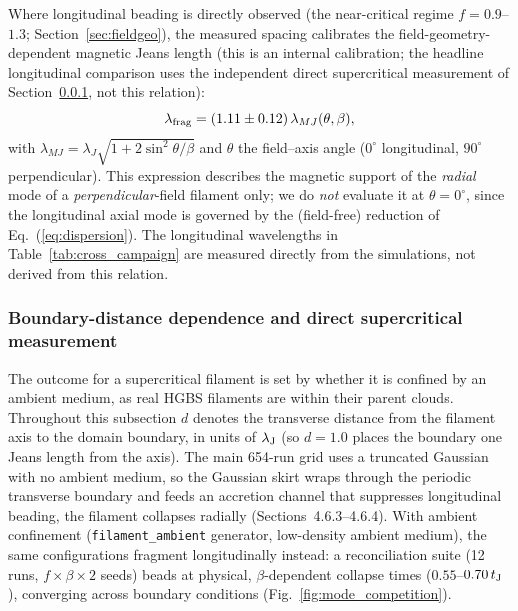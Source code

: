 \documentclass[usenatbib,twoside,twocolumn]{mnras}
\begin{document}
Where longitudinal beading is directly observed (the near-critical regime $f=0.9$--$1.3$; Section~\ref{sec:fieldgeo}), the measured spacing calibrates the field-geometry-dependent magnetic Jeans length (this is an internal calibration; the headline longitudinal comparison uses the independent direct supercritical measurement of Section~\ref{sec:modecompetition}, not this relation):
\begin{equation}
\lambda_{\rm frag} = (1.11 \pm 0.12)\,\lambda_{MJ}(\theta, \beta),
\label{eq:calib}
\end{equation}
with $\lambda_{MJ}=\lambda_J\sqrt{1+2\sin^2\theta/\beta}$ \citep{Nakamura1993} and $\theta$ the field--axis angle ($0^\circ$ longitudinal, $90^\circ$ perpendicular). This expression describes the magnetic support of the \emph{radial} mode of a \emph{perpendicular}-field filament only; we do \emph{not} evaluate it at $\theta=0^\circ$, since the longitudinal axial mode is governed by the (field-free) reduction of Eq.~(\ref{eq:dispersion}). The longitudinal wavelengths in Table~\ref{tab:cross_campaign} are measured directly from the simulations, not derived from this relation.


\subsubsection{Boundary-distance dependence and direct supercritical measurement}
\label{sec:modecompetition}

The outcome for a supercritical filament is set by whether it is confined by an ambient medium, as real HGBS filaments are within their parent clouds. Throughout this subsection $d$ denotes the transverse distance from the filament axis to the domain boundary, in units of $\lambda_{\rm J}$ (so $d=1.0$ places the boundary one Jeans length from the axis). The main 654-run grid uses a truncated Gaussian with no ambient medium, so the Gaussian skirt wraps through the periodic transverse boundary and feeds an accretion channel that suppresses longitudinal beading, the filament collapses radially (Sections~4.6.3--4.6.4). With ambient confinement (\texttt{filament\_ambient} generator, low-density ambient medium), the same configurations fragment longitudinally instead: a reconciliation suite (12 runs, $f\times\beta\times2$ seeds) beads at physical, $\beta$-dependent collapse times ($0.55$--$0.70\,t_{\rm J}$), converging across boundary conditions (Fig.~\ref{fig:mode_competition}).
\end{document}
